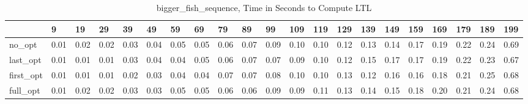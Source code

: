 \begin{table}
\caption{bigger_fish_sequence, Time in Seconds to Compute LTL}
\label{bigger_fish_sequence_LTL_time}
\begin{tabular}{lllllllllllllllllllll}
\toprule
 & 9 & 19 & 29 & 39 & 49 & 59 & 69 & 79 & 89 & 99 & 109 & 119 & 129 & 139 & 149 & 159 & 169 & 179 & 189 & 199 \\
\midrule
no_opt & 0.01 & 0.02 & 0.02 & 0.03 & 0.04 & 0.05 & 0.05 & 0.06 & 0.07 & 0.09 & 0.10 & 0.10 & 0.12 & 0.13 & 0.14 & 0.17 & 0.19 & 0.22 & 0.24 & 0.69 \\
last_opt & 0.01 & 0.01 & 0.01 & 0.03 & 0.04 & 0.04 & 0.05 & 0.06 & 0.07 & 0.07 & 0.09 & 0.10 & 0.12 & 0.15 & 0.17 & 0.17 & 0.19 & 0.22 & 0.23 & 0.67 \\
first_opt & 0.01 & 0.01 & 0.01 & 0.02 & 0.03 & 0.04 & 0.04 & 0.07 & 0.07 & 0.08 & 0.10 & 0.10 & 0.13 & 0.12 & 0.16 & 0.16 & 0.18 & 0.21 & 0.25 & 0.68 \\
full_opt & 0.01 & 0.02 & 0.02 & 0.03 & 0.03 & 0.05 & 0.05 & 0.06 & 0.06 & 0.09 & 0.09 & 0.11 & 0.13 & 0.14 & 0.15 & 0.18 & 0.20 & 0.21 & 0.24 & 0.68 \\
\bottomrule
\end{tabular}
\end{table}
